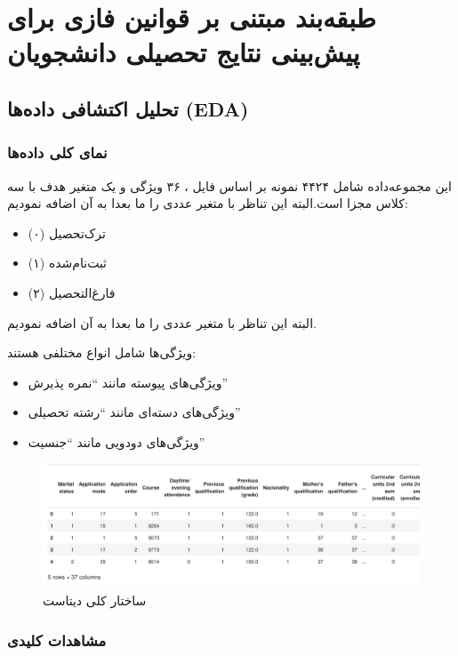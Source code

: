 \section[ پیش‌بینی نتایج تحصیلی ]{طبقه‌بند مبتنی بر قوانین فازی برای پیش‌بینی نتایج تحصیلی دانشجویان}
\subsection{ تحلیل اکتشافی داده‌ها (EDA)}

\subsubsection{نمای کلی داده‌ها}

این مجموعه‌داده شامل ۴۴۲۴ نمونه بر اساس فایل ، ۳۶ ویژگی و یک متغیر هدف با سه کلاس مجزا است.البته این تناظر با متغیر عددی را ما بعدا به آن اضافه نمودیم:
\begin{itemize}
	\item ترک‌تحصیل (۰)
	\item ثبت‌نام‌شده (۱)
	\item فارغ‌التحصیل (۲)
\end{itemize}

البته این تناظر با متغیر عددی را ما بعدا به آن اضافه نمودیم.


ویژگی‌ها شامل انواع مختلفی هستند:
\begin{itemize}
	\item ویژگی‌های پیوسته مانند ``نمره پذیرش''
	\item ویژگی‌های دسته‌ای مانند ``رشته تحصیلی''
	\item ویژگی‌های دودویی مانند ``جنسیت''
\end{itemize}
\begin{figure}[H]
	\centering
	\includegraphics[width=0.7\linewidth]{./img/head}
	\caption{ساختار کلی دیتاست}
	\label{fig:head}
\end{figure}

\subsubsection{مشاهدات کلیدی}


